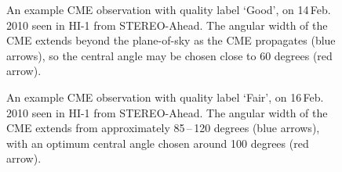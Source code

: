 \documentclass[10pt, a4paper, oneside]{article}
\begin{document}
\begin{figure}[ht]
\caption{An example CME observation with quality label `Good', on 14\,Feb.\,2010 seen in HI-1 from STEREO-Ahead. The angular width of the CME extends beyond the plane-of-sky as the CME propagates (blue arrows), so the central angle may be chosen close to 60 degrees (red arrow).}
\label{good}
\end{figure}



\begin{figure}[ht]
\caption{An example CME observation with quality label `Fair', on 16\,Feb.\,2010 seen in HI-1 from STEREO-Ahead. The angular width of the CME extends from approximately 85\,--\,120 degrees (blue arrows), with an optimum central angle chosen around 100 degrees (red arrow).}
\label{fair}
\end{figure}
\end{document}
